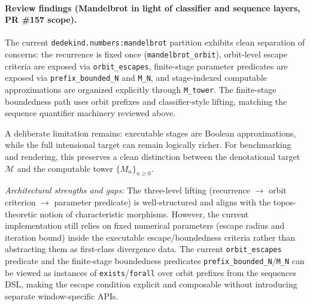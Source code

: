 \documentclass[11pt, a4paper]{report}
\begin{document}
\paragraph{Review findings (Mandelbrot in light of classifier and sequence layers, PR \#157 scope).}
The current \texttt{dedekind.numbers:mandelbrot} partition exhibits clean separation of concerns: the recurrence is fixed once (\texttt{mandelbrot\_orbit}), orbit-level escape criteria are exposed via \texttt{orbit\_escapes}, finite-stage parameter predicates are exposed via \texttt{prefix\_bounded\_N} and \texttt{M\_N}, and stage-indexed computable approximations are organized explicitly through \texttt{M\_tower}.
The finite-stage boundedness path uses orbit prefixes and classifier-style lifting, matching the sequence quantifier machinery reviewed above.

A deliberate limitation remains: executable stages are Boolean approximations, while the full intensional target can remain logically richer.
For benchmarking and rendering, this preserves a clean distinction between the denotational target $\mathcal{M}$ and the computable tower $\{M_n\}_{n\ge 0}$.

\textit{Architectural strengths and gaps:} The three-level lifting (recurrence $\to$ orbit criterion $\to$ parameter predicate) is well-structured and aligns with the topos-theoretic notion of characteristic morphisms.
However, the current implementation still relies on fixed numerical parameters (escape radius and iteration bound) inside the executable escape/boundedness criteria rather than abstracting them as first-class divergence data.
The current \texttt{orbit\_escapes} predicate and the finite-stage boundedness predicates \texttt{prefix\_bounded\_N}/\texttt{M\_N} can be viewed as instances of \texttt{exists}/\texttt{forall} over orbit prefixes from the sequences DSL, making the escape condition explicit and composable without introducing separate window-specific APIs.
\end{document}
